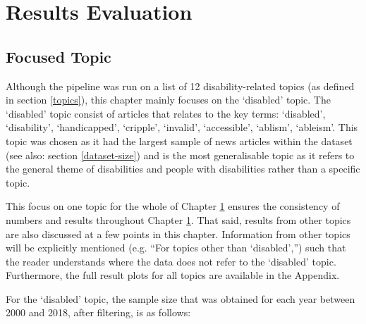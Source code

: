 \documentclass{report}
\begin{document}



\chapter{Results Evaluation} \label{Results Evaluation}  %

\section{Focused Topic} \label{Focused topic}
Although the pipeline was run on a list of 12 disability-related topics (as defined in section \ref{topics}), this chapter mainly focuses on the `disabled' topic.
The `disabled' topic consist of articles that relates to the key terms: `disabled', `disability', `handicapped', `cripple', `invalid', `accessible', `ablism', `ableism'.
This topic was chosen as it had the largest sample of news articles within the dataset (see also: section \ref{dataset-size}) and is the most generalisable topic as it refers to the general theme of disabilities and people with disabilities rather than a specific topic.

This focus on one topic for the whole of Chapter \ref{Results Evaluation} ensures the consistency of numbers and results throughout Chapter \ref{Results Evaluation}.
That said, results from other topics are also discussed at a few points in this chapter.
Information from other topics will be explicitly mentioned (e.g. ``For topics other than `disabled','') such that the reader understands where the data does not refer to the `disabled' topic.
Furthermore, the full result plots for all topics are available in the Appendix.

For the `disabled' topic, the sample size that was obtained for each year between 2000 and 2018, after filtering, is as follows:
\end{document}

